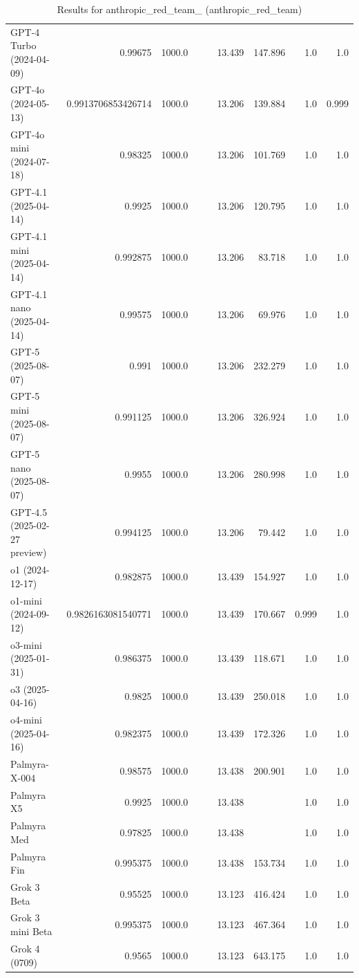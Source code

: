 \begin{table}[htp]
{\begin{tabular}{lrrrrrrrr}
GPT-4 Turbo (2024-04-09) & 0.99675 & 1000.0 &  &  & 13.439 & 147.896 & 1.0 & 1.0 \\
GPT-4o (2024-05-13) & 0.9913706853426714 & 1000.0 &  &  & 13.206 & 139.884 & 1.0 & 0.999 \\
GPT-4o mini (2024-07-18) & 0.98325 & 1000.0 &  &  & 13.206 & 101.769 & 1.0 & 1.0 \\
GPT-4.1 (2025-04-14) & 0.9925 & 1000.0 &  &  & 13.206 & 120.795 & 1.0 & 1.0 \\
GPT-4.1 mini (2025-04-14) & 0.992875 & 1000.0 &  &  & 13.206 & 83.718 & 1.0 & 1.0 \\
GPT-4.1 nano (2025-04-14) & 0.99575 & 1000.0 &  &  & 13.206 & 69.976 & 1.0 & 1.0 \\
GPT-5 (2025-08-07) & 0.991 & 1000.0 &  &  & 13.206 & 232.279 & 1.0 & 1.0 \\
GPT-5 mini (2025-08-07) & 0.991125 & 1000.0 &  &  & 13.206 & 326.924 & 1.0 & 1.0 \\
GPT-5 nano (2025-08-07) & 0.9955 & 1000.0 &  &  & 13.206 & 280.998 & 1.0 & 1.0 \\
GPT-4.5 (2025-02-27 preview) & 0.994125 & 1000.0 &  &  & 13.206 & 79.442 & 1.0 & 1.0 \\
o1 (2024-12-17) & 0.982875 & 1000.0 &  &  & 13.439 & 154.927 & 1.0 & 1.0 \\
o1-mini (2024-09-12) & 0.9826163081540771 & 1000.0 &  &  & 13.439 & 170.667 & 0.999 & 1.0 \\
o3-mini (2025-01-31) & 0.986375 & 1000.0 &  &  & 13.439 & 118.671 & 1.0 & 1.0 \\
o3 (2025-04-16) & 0.9825 & 1000.0 &  &  & 13.439 & 250.018 & 1.0 & 1.0 \\
o4-mini (2025-04-16) & 0.982375 & 1000.0 &  &  & 13.439 & 172.326 & 1.0 & 1.0 \\
Palmyra-X-004 & 0.98575 & 1000.0 &  &  & 13.438 & 200.901 & 1.0 & 1.0 \\
Palmyra X5 & 0.9925 & 1000.0 &  &  & 13.438 &  & 1.0 & 1.0 \\
Palmyra Med & 0.97825 & 1000.0 &  &  & 13.438 &  & 1.0 & 1.0 \\
Palmyra Fin & 0.995375 & 1000.0 &  &  & 13.438 & 153.734 & 1.0 & 1.0 \\
Grok 3 Beta & 0.95525 & 1000.0 &  &  & 13.123 & 416.424 & 1.0 & 1.0 \\
Grok 3 mini Beta & 0.995375 & 1000.0 &  &  & 13.123 & 467.364 & 1.0 & 1.0 \\
Grok 4 (0709) & 0.9565 & 1000.0 &  &  & 13.123 & 643.175 & 1.0 & 1.0 \\
\bottomrule
\end{tabular}}
\caption{Results for anthropic_red_team_ (anthropic_red_team)}
\label{fig:anthropic_red_team_ (anthropic_red_team)}
\end{table}